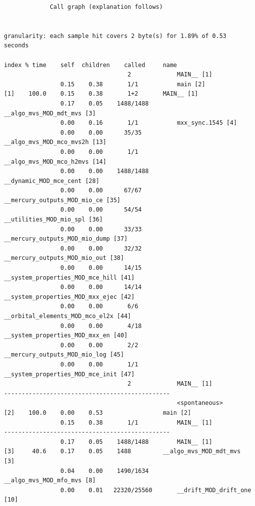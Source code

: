 \documentclass[a4paper,twoside]{article}
\begin{document}
\begin{verbatim}
		     Call graph (explanation follows)


granularity: each sample hit covers 2 byte(s) for 1.89% of 0.53 seconds

index % time    self  children    called     name
                                   2             MAIN__ [1]
                0.15    0.38       1/1           main [2]
[1]    100.0    0.15    0.38       1+2       MAIN__ [1]
                0.17    0.05    1488/1488        __algo_mvs_MOD_mdt_mvs [3]
                0.00    0.16       1/1           mxx_sync.1545 [4]
                0.00    0.00      35/35          __algo_mvs_MOD_mco_mvs2h [13]
                0.00    0.00       1/1           __algo_mvs_MOD_mco_h2mvs [14]
                0.00    0.00    1488/1488        __dynamic_MOD_mce_cent [28]
                0.00    0.00      67/67          __mercury_outputs_MOD_mio_ce [35]
                0.00    0.00      54/54          __utilities_MOD_mio_spl [36]
                0.00    0.00      33/33          __mercury_outputs_MOD_mio_dump [37]
                0.00    0.00      32/32          __mercury_outputs_MOD_mio_out [38]
                0.00    0.00      14/15          __system_properties_MOD_mce_hill [41]
                0.00    0.00      14/14          __system_properties_MOD_mxx_ejec [42]
                0.00    0.00       6/6           __orbital_elements_MOD_mco_el2x [44]
                0.00    0.00       4/18          __system_properties_MOD_mxx_en [40]
                0.00    0.00       2/2           __mercury_outputs_MOD_mio_log [45]
                0.00    0.00       1/1           __system_properties_MOD_mce_init [47]
                                   2             MAIN__ [1]
-----------------------------------------------
                                                 <spontaneous>
[2]    100.0    0.00    0.53                 main [2]
                0.15    0.38       1/1           MAIN__ [1]
-----------------------------------------------
                0.17    0.05    1488/1488        MAIN__ [1]
[3]     40.6    0.17    0.05    1488         __algo_mvs_MOD_mdt_mvs [3]
                0.04    0.00    1490/1634        __algo_mvs_MOD_mfo_mvs [8]
                0.00    0.01   22320/25560       __drift_MOD_drift_one [10]
\end{verbatim}
\end{document}
